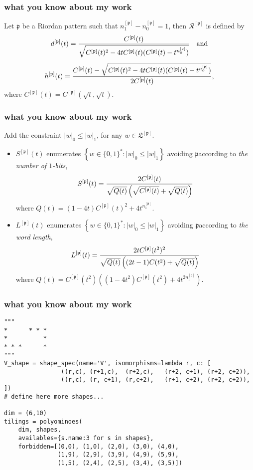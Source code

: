 \documentclass{beamer}
\begin{document}
\begin{frame}[fragile]
\frametitle{what you know about my work}

Let $\mathfrak{p}$ be a Riordan pattern
such that $n_1^{[\mathfrak{p}]}-n_0^{[\mathfrak{p}]}=1$, then
$\mathcal{R}^{\left[\mathfrak{p}\right]}$ is defined by
$$d^{[\mathfrak{p}]}(t)={C^{[\mathfrak{p}]}(t)
\over \sqrt{C^{[\mathfrak{p}]}(t)^2-4tC^{[\mathfrak{p}]}(t)(C^{[\mathfrak{p}]}(t)-t^{n_0^{[\mathfrak{p}]}})}}\quad\text{and}$$
$$h^{[\mathfrak{p}]}(t)={C^{[\mathfrak{p}]}(t) -\sqrt{C^{[\mathfrak{p}]}(t)^2-4tC^{[\mathfrak{p}]}(t)(C^{[\mathfrak{p}]}(t)-t^{n_0^{[\mathfrak{p}]}})}
\over 2 C^{[\mathfrak{p}]}(t)},$$
where $C^{[\mathfrak{p}]}(t)=C^{[\mathfrak{p}]}(\sqrt{t},\sqrt{t})$.
\end{frame}

\begin{frame}[fragile]
\frametitle{what you know about my work}

Add the constraint $|w|_0\leq |w|_1$, for any $w\in \mathfrak{L}^{[\mathfrak{p}]}$.
\begin{itemize}
\item $S^{[\mathfrak{p}]}(t)$ enumerates $\left\lbrace w\in \lbrace 0,1 \rbrace^{*}:
|w|_0\leq |w|_1\right\rbrace$ avoiding $\mathfrak{p}$\newline according to
\textit{the number of $1$-bits},
$$S^{[\mathfrak{p}]}(t)={2C^{[\mathfrak{p}]}(t) \over \sqrt{Q(t)}\left(\sqrt{C^{[\mathfrak{p}]}(t)}+ \sqrt{Q(t)} \right)} $$
    where $Q(t)={(1-4t)C^{[\mathfrak{p}]}(t)^2+4t^{n_1^{[\mathfrak{p}]}}}.$
\item $L^{[\mathfrak{p}]}(t)$ enumerates $\left\lbrace w\in \lbrace 0,1 \rbrace^{*}:
|w|_0\leq |w|_1\right\rbrace$ avoiding $\mathfrak{p}$\newline according to
\textit{the word length},
$$L^{[\mathfrak{p}]}(t)= {2tC^{[\mathfrak{p}]}(t^2)^2 \over \sqrt{Q(t)}\left((2t-1)C(t^2)+ \sqrt{ Q(t) } \right)}$$
where $Q(t)=C^{[\mathfrak{p}]}(t^2)\left( (1-4t^2)C^{[\mathfrak{p}]}(t^2)+4t^{2n_1^{[\mathfrak{p}]}}\right).$
\end{itemize}
\end{frame}

\begin{frame}[fragile]
\frametitle{what you know about my work}

\begin{verbatim}
"""
*      * * *   
*          *   
* * *      *   
"""
V_shape = shape_spec(name='V', isomorphisms=lambda r, c: [
                ((r,c), (r+1,c),  (r+2,c),   (r+2, c+1), (r+2, c+2)),
                ((r,c), (r, c+1), (r,c+2),   (r+1, c+2), (r+2, c+2)), ])
# define here more shapes...

dim = (6,10)
tilings = polyominoes(
    dim, shapes,
    availables={s.name:3 for s in shapes},
    forbidden=[(0,0), (1,0), (2,0), (3,0), (4,0),
               (1,9), (2,9), (3,9), (4,9), (5,9),
               (1,5), (2,4), (2,5), (3,4), (3,5)])
\end{verbatim}
\end{frame}
\end{document}
